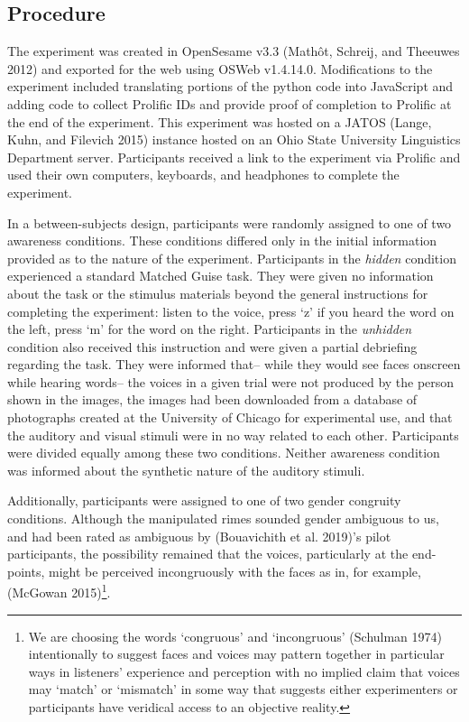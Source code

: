 \documentclass[
  letterpaper,
  DIV=11,
  numbers=noendperiod]{scrartcl}
\begin{document}
\subsection{Procedure}\label{sub-procedure}

The experiment was created in OpenSesame v3.3 (Mathôt, Schreij, and
Theeuwes 2012) and exported for the web using OSWeb v1.4.14.0.
Modifications to the experiment included translating portions of the
python code into JavaScript and adding code to collect Prolific IDs and
provide proof of completion to Prolific at the end of the experiment.
This experiment was hosted on a JATOS (Lange, Kuhn, and Filevich 2015)
instance hosted on an Ohio State University Linguistics Department
server. Participants received a link to the experiment via Prolific and
used their own computers, keyboards, and headphones to complete the
experiment.

In a between-subjects design, participants were randomly assigned to one
of two awareness conditions. These conditions differed only in the
initial information provided as to the nature of the experiment.
Participants in the \emph{hidden} condition experienced a standard
Matched Guise task. They were given no information about the task or the
stimulus materials beyond the general instructions for completing the
experiment: listen to the voice, press `z' if you heard the word on the
left, press `m' for the word on the right. Participants in the
\emph{unhidden} condition also received this instruction and were given
a partial debriefing regarding the task. They were informed that-- while
they would see faces onscreen while hearing words-- the voices in a
given trial were not produced by the person shown in the images, the
images had been downloaded from a database of photographs created at the
University of Chicago for experimental use, and that the auditory and
visual stimuli were in no way related to each other. Participants were
divided equally among these two conditions. Neither awareness condition
was informed about the synthetic nature of the auditory stimuli.

Additionally, participants were assigned to one of two gender congruity
conditions. Although the manipulated rimes sounded gender ambiguous to
us, and had been rated as ambiguous by (Bouavichith et al. 2019)'s pilot
participants, the possibility remained that the voices, particularly at
the end-points, might be perceived incongruously with the faces as in,
for example, (McGowan 2015)\footnote{We are choosing the words
  `congruous' and `incongruous' (Schulman 1974) intentionally to suggest
  faces and voices may pattern together in particular ways in listeners'
  experience and perception with no implied claim that voices may
  `match' or `mismatch' in some way that suggests either experimenters
  or participants have veridical access to an objective reality.}.
\end{document}
